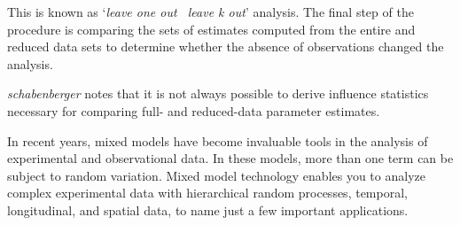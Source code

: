 \documentclass[12pt, a4paper]{report}
\theoremstyle{plain}
\theoremstyle{definition}
\theoremstyle{remark}
\begin{document}
This is known as `\textit{leave one out \ leave k
	out}' analysis. The final step of the procedure is comparing the
sets of estimates computed from the entire and reduced data sets
to determine whether the absence of observations changed the
analysis.

\textit{schabenberger} notes that it is not always possible to
derive influence statistics necessary for comparing full- and
reduced-data parameter estimates. 

%
%





In recent years, mixed models have become invaluable tools in the analysis of experimental and observational
data. In these models, more than one term can be subject to random variation. Mixed model
technology enables you to analyze complex experimental data with hierarchical random processes, temporal,
longitudinal, and spatial data, to name just a few important applications. 
%
\end{document}
